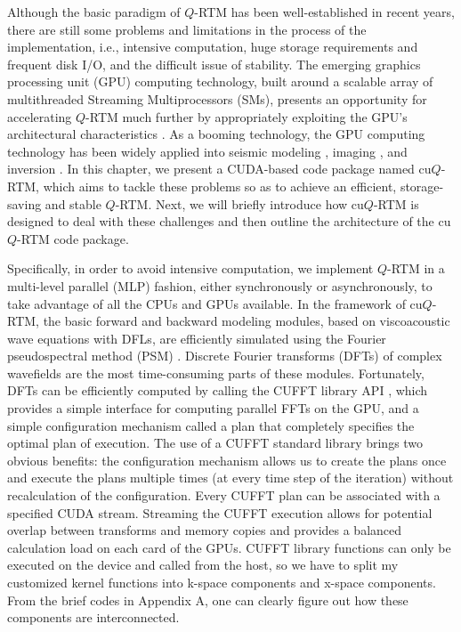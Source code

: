 Although the basic paradigm of $Q$-RTM has been well-established in recent years, there are still some problems and limitations in the process of the implementation, i.e., intensive computation, huge storage requirements and frequent disk I/O, and the difficult issue of stability. The emerging graphics processing unit (GPU) computing technology, built around a scalable array of multithreaded Streaming Multiprocessors (SMs), presents an opportunity for accelerating $Q$-RTM much further by appropriately exploiting the GPU's architectural characteristics \citep{tan2016faster, farquhar2016gpu}. As a booming technology, the GPU computing technology has been widely applied into seismic modeling \citep{micikevicius20093d, zhang2014time}, imaging \citep{zhang2009accelerating, foltinek2009industrial, liu2012fourier, Liu20133D, Yang2014RTM}, and inversion \citep{shin20143d, Yang2015A}. In this chapter, we present a CUDA-based code package named cu$Q$-RTM, which aims to tackle these problems so as to achieve an efficient, storage-saving and stable $Q$-RTM. Next, we will briefly introduce how cu$Q$-RTM is designed to deal with these challenges and then outline the architecture of the cu$Q$-RTM code package. 

Specifically, in order to avoid intensive computation, we implement $Q$-RTM in a multi-level parallel (MLP) fashion, either synchronously or asynchronously, to take advantage of all the CPUs and GPUs available. In the framework of cu$Q$-RTM, the basic forward and backward modeling modules, based on viscoacoustic wave equations with DFLs, are efficiently simulated using the Fourier pseudospectral method (PSM) \citep{Carcione2010A, Zhu2014Modeling, chen2016two}. Discrete Fourier transforms (DFTs) of complex wavefields are the most time-consuming parts of these modules. Fortunately, DFTs can be efficiently computed by calling the CUFFT library API \citep{guide2013cuda}, which provides a simple interface for computing parallel FFTs on the GPU, and a simple configuration mechanism called a plan that completely specifies the optimal plan of execution. The use of a CUFFT standard library brings two obvious benefits: the configuration mechanism allows us to create the plans once and execute the plans multiple times (at every time step of the iteration) without recalculation of the configuration. Every CUFFT plan can be associated with a specified CUDA stream. Streaming the CUFFT execution allows for potential overlap between transforms and memory copies and provides a balanced calculation load on each card of the GPUs. CUFFT library functions can only be executed on the device and called from the host, so we have to split my customized kernel functions into k-space components and x-space components. From the brief codes in Appendix A, one can clearly figure out how these components are interconnected.

